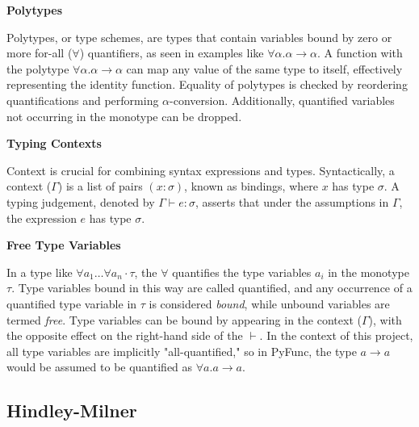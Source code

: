 \documentclass{l4proj}
\begin{document}
\textbf{Polytypes}

Polytypes, or type schemes, are types that contain variables bound by zero or more for-all ($\forall$) quantifiers, as seen in examples like $\forall \alpha . \alpha \rightarrow \alpha$.
A function with the polytype $\forall \alpha . \alpha \rightarrow \alpha$ can map any value of the same type to itself, effectively representing the identity function.
Equality of polytypes is checked by reordering quantifications and performing $\alpha$-conversion.
Additionally, quantified variables not occurring in the monotype can be dropped.

\textbf{Typing Contexts}

Context is crucial for combining syntax expressions and types.
Syntactically, a context ($\Gamma$) is a list of pairs $(x : \sigma)$, known as bindings, where $x$ has type $\sigma$.
A typing judgement, denoted by $\Gamma \vdash e : \sigma$, asserts that under the assumptions in $\Gamma$, the expression $e$ has type $\sigma$.

\textbf{Free Type Variables}

In a type like $\forall a_1 \dots \forall a_n \cdot \tau$, the $\forall$ quantifies the type variables $a_i$ in the monotype $\tau$.
Type variables bound in this way are called quantified, and any occurrence of a quantified type variable in $\tau$ is considered \emph{bound}, while unbound variables are termed \emph{free}.
Type variables can be bound by appearing in the context ($\Gamma$), with the opposite effect on the right-hand side of the $\vdash$.
In the context of this project, all type variables are implicitly "all-quantified," so in PyFunc, the type $a \rightarrow a$ would be assumed to be quantified as $\forall a.a \rightarrow a$.

\subsection{Hindley-Milner}
\end{document}
